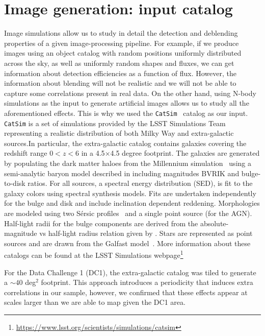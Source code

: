 \documentclass[twocolumn]{aastex62}
\begin{document}
\section{Image generation: input catalog}
\label{sec:inputs}
Image simulations allow us to study in detail the detection and deblending properties of a given image-processing pipeline. For example, if we produce images using an object catalog with random positions uniformly distributed across the sky, as well as uniformly random shapes and fluxes, we can get information about detection efficiencies as a function of flux.  However, the information about blending will not be realistic and we will not be able to capture some correlations present in real data. On the other hand, using N-body simulations as the input to generate artificial images allows us to study all the aforementioned effects. This is why we used the \texttt{CatSim}~\citep{2010SPIE.7738E..1OC,2014SPIE.9150E..14C} catalog as our input.  \texttt{CatSim} is a set of simulations provided by the LSST Simulations Team representing a realistic distribution of both Milky Way and extra-galactic sources.In particular, the extra-galactic catalog contains galaxies covering the redshift range $0 < z < 6$ in a 4.5$\times$4.5 degree footprint. The galaxies are generated by populating the dark matter haloes from the Millennium simulation~\citep{2005Nature.435.629S} using a semi-analytic baryon model described in \citet{2006MNRAS.366..499D} including magnitudes BVRIK and bulge-to-disk ratios. For all sources, a spectral energy distribution (SED), is fit to the galaxy colors using \citet{2003MNRAS.344.1000B} spectral synthesis models. Fits are undertaken independently for the bulge and disk and include inclination dependent reddening. Morphologies are modeled using two S\'{e}rsic profiles~\citep{1963BAAA....6...41S} and a single point source (for the AGN). Half-light radii for the bulge components are derived from the absolute-magnitude vs half-light radius relation given by \citet{2011A&A...534A...3G}. Stars are represented as point sources and are drawn from the Galfast model~\citep{2008ApJ...673..864J}. More information about these catalogs can be found at the LSST Simulations webpage\footnote{\url{https://www.lsst.org/scientists/simulations/catsim}}

For the Data Challenge 1 (DC1), the extra-galactic catalog was tiled to generate a $\sim 40$ deg$^{2}$ footprint. This approach introduces a periodicity that induces extra correlations in our sample, however, we confirmed that these effects appear at scales larger than we are able to map given the DC1 area.
\end{document}
